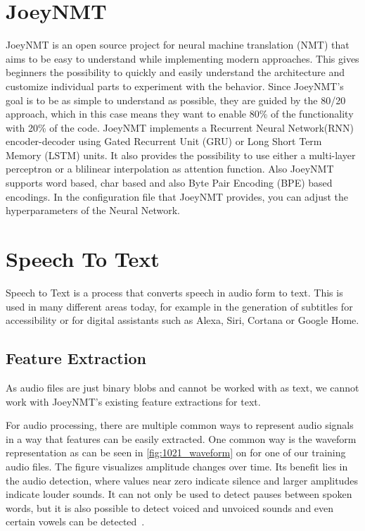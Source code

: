 \documentclass[11pt,a4paper]{article}
\begin{document}
\section{JoeyNMT}
JoeyNMT is an open source project for neural machine
translation (NMT) that aims to be easy to understand while implementing modern approaches.
This gives beginners the possibility to quickly and easily understand the architecture and customize individual parts to experiment with the behavior.
Since JoeyNMT's goal is to be as simple to understand as possible, they are guided by the 80/20 approach, which in this case means they want to enable 80\% of the functionality with 20\% of the code.
JoeyNMT implements a Recurrent Neural Network(RNN) encoder-decoder using Gated Recurrent Unit (GRU) or Long Short Term Memory (LSTM) units.
It also provides the possibility to use either a multi-layer perceptron or a blilinear interpolation as attention function.
Also JoeyNMT supports word based, char based and also Byte Pair Encoding (BPE) based encodings.
In the configuration file that JoeyNMT provides, you can adjust the hyperparameters of the Neural Network. 
\cite{DBLP:journals/corr/abs-1907-12484}

\section{Speech To Text}

Speech to Text is a process that converts speech in audio form to text. 
This is used in many different areas today, for example in the generation of subtitles for accessibility or for digital assistants such as Alexa, Siri, Cortana or Google Home.

\subsection{Feature Extraction}

As audio files are just binary blobs and cannot be worked with as text,
we cannot work with JoeyNMT's existing feature extractions for text.

For audio processing, there are multiple common ways to represent audio signals in a way that features can be easily extracted.
One common way is the waveform representation as can be seen in \autoref{fig:1021_waveform} on  for one of our training audio files.
The figure visualizes amplitude changes over time.
Its benefit lies in the audio detection, where values near zero indicate silence
and larger amplitudes indicate louder sounds.
It can not only be used to detect pauses between spoken words, but it is also possible to detect voiced and unvoiced sounds and even certain vowels can be detected~\cite{Comer_1162014}.
\end{document}
